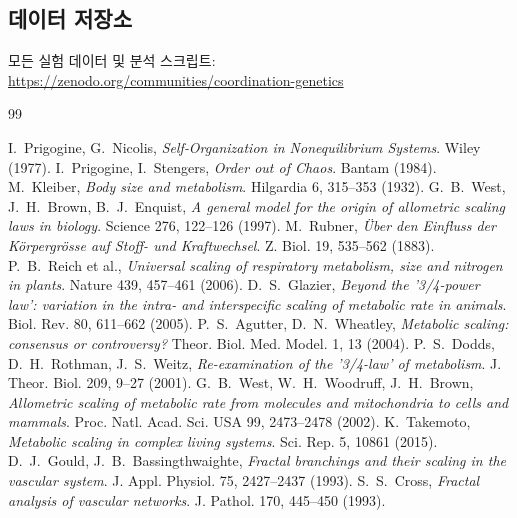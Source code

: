 \documentclass[11pt,a4paper]{article}
\begin{document}
	\subsection{데이터 저장소}
	
	모든 실험 데이터 및 분석 스크립트:\\
	\url{https://zenodo.org/communities/coordination-genetics}
	
	\begin{thebibliography}{99}
		
		 I.~Prigogine, G.~Nicolis, \emph{Self‑Organization in Nonequilibrium Systems}. Wiley (1977).
		 I.~Prigogine, I.~Stengers, \emph{Order out of Chaos}. Bantam (1984).
		 M.~Kleiber, \emph{Body size and metabolism}. Hilgardia 6, 315–353 (1932).
		 G.~B.~West, J.~H.~Brown, B.~J.~Enquist, \emph{A general model for the origin of allometric scaling laws in biology}. Science 276, 122–126 (1997).
		 M.~Rubner, \emph{Über den Einfluss der Körpergrösse auf Stoff- und Kraftwechsel}. Z. Biol. 19, 535–562 (1883).
		 P.~B.~Reich et al., \emph{Universal scaling of respiratory metabolism, size and nitrogen in plants}. Nature 439, 457–461 (2006).
		 D.~S.~Glazier, \emph{Beyond the '3/4-power law': variation in the intra- and interspecific scaling of metabolic rate in animals}. Biol. Rev. 80, 611–662 (2005).
		 P.~S.~Agutter, D.~N.~Wheatley, \emph{Metabolic scaling: consensus or controversy?} Theor. Biol. Med. Model. 1, 13 (2004).
		 P.~S.~Dodds, D.~H.~Rothman, J.~S.~Weitz, \emph{Re-examination of the '3/4-law' of metabolism}. J. Theor. Biol. 209, 9–27 (2001).
		 G.~B.~West, W.~H.~Woodruff, J.~H.~Brown, \emph{Allometric scaling of metabolic rate from molecules and mitochondria to cells and mammals}. Proc. Natl. Acad. Sci. USA 99, 2473–2478 (2002).
		 K.~Takemoto, \emph{Metabolic scaling in complex living systems}. Sci. Rep. 5, 10861 (2015).
		 D.~J.~Gould, J.~B.~Bassingthwaighte, \emph{Fractal branchings and their scaling in the vascular system}. J. Appl. Physiol. 75, 2427–2437 (1993).
		 S.~S.~Cross, \emph{Fractal analysis of vascular networks}. J. Pathol. 170, 445–450 (1993).
		
	\end{thebibliography}
	
\end{document}
